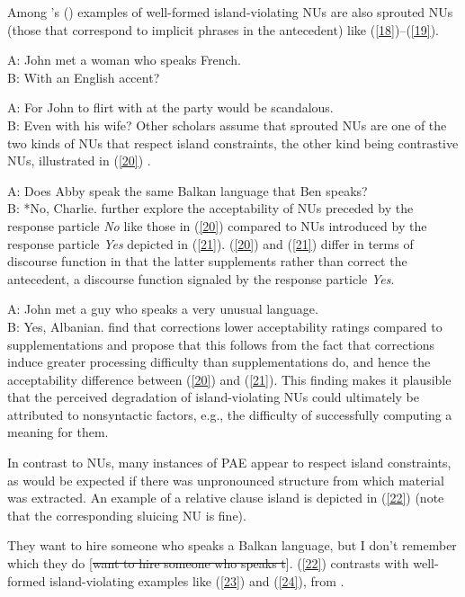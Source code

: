 \documentclass[output=paper
                ,modfonts
                ,nonflat
	        ,collection
	        ,collectionchapter
	        ,collectiontoclongg
 	        ,biblatex
                ,babelshorthands
                ,newtxmath
                ,draftmode
                ,colorlinks, citecolor=brown
]{./langsci/langscibook}
\begin{document}
{Among \citeauthor{CJ2005a}'s (\citeyear[245]{CJ2005a}) examples of well-formed island-violating NUs are also sprouted NUs (those that correspond to implicit phrases in the antecedent) like (\ref{18})--(\ref{19}).

\ea A: John met a woman who speaks French.\\B: With an English accent?\label{18}\z

\ea A: For John to flirt with at the party would be scandalous. \\B: Even with his wife?\label{19}\z
Other scholars assume that sprouted NUs are one of the two kinds of NUs that respect island constraints, the other kind being contrastive NUs, illustrated in (\ref{20}) \citep{Chung1995, Merchant2001, Griffiths2014}.

\ea A: Does Abby speak the same Balkan language that Ben speaks?\\
B: *No, Charlie. \citep{Merchant2001}  \label{20}\z
%
\citet{Schmeh2015} further explore the acceptability of NUs preceded by the response particle \textit{No} like those in (\ref{20}) compared to NUs introduced by the response particle \textit{Yes} depicted in (\ref{21}). (\ref{20}) and (\ref{21}) differ in terms of discourse function in that the latter supplements rather than correct the antecedent, a discourse function signaled by the response particle \textit{Yes}.

\ea A: John met a guy who speaks a very unusual language. \\B: Yes, Albanian. \citep[245]{CJ2005a} \label{21}\z
%
\citet{Schmeh2015} find that corrections lower acceptability ratings compared to supplementations and propose that this follows from the fact that corrections induce greater processing difficulty than supplementations do, and hence the acceptability difference between (\ref{20}) and (\ref{21}). This finding makes it plausible that the perceived degradation of island-violating NUs could ultimately be attributed to nonsyntactic factors, e.g., the difficulty of successfully computing a meaning for them.

In contrast to NUs, many instances of PAE appear to respect island constraints, as would be expected if there was unpronounced structure from which material was extracted. An example of a relative clause island is depicted in (\ref{22}) (note that the corresponding sluicing NU is fine).

\ea *They want to hire someone who speaks a Balkan language, but I don't remember which they do [\sout{want to hire someone who speaks t}]. \citep[6]{Merchant2001}\label{22}\z
(\ref{22}) contrasts with well-formed island-violating examples like (\ref{23}) and (\ref{24}), from \citet{Ginzburg2018}.

}
\end{document}
